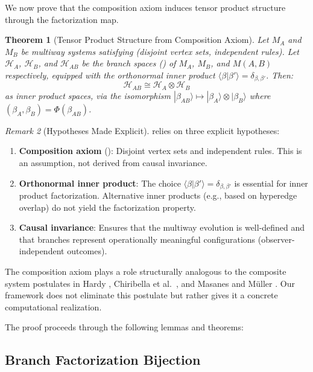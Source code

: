\documentclass[11pt,a4paper]{article}
\newtheorem{theorem}{Theorem}[section]
\theoremstyle{definition}
\theoremstyle{remark}
\newtheorem{remark}[theorem]{Remark}
\newcommand{\Hilb}{\mathcal{H}}
\newcommand{\ket}[1]{|#1\rangle}
\newcommand{\braket}[2]{\langle#1|#2\rangle}
\begin{document}
We now prove that the composition axiom induces tensor product structure through the factorization map.

\begin{theorem}[Tensor Product Structure from Composition Axiom]
\label{thm:tensor_product_main}
Let $M_A$ and $M_B$ be multiway systems satisfying 
(disjoint vertex sets, independent rules). Let $\Hilb_A$, $\Hilb_B$,
and $\Hilb_{AB}$ be the branch spaces () of
$M_A$, $M_B$, and $M(A,B)$ respectively, equipped with the
orthonormal inner product $\braket{\beta}{\beta'} = \delta_{\beta,\beta'}$.
Then:
\begin{equation}
\Hilb_{AB} \cong \Hilb_A \otimes \Hilb_B
\end{equation}
as inner product spaces, via the isomorphism
$\ket{\beta_{AB}} \mapsto \ket{\beta_A} \otimes \ket{\beta_B}$ where
$(\beta_A, \beta_B) = \Phi(\beta_{AB})$.
\end{theorem}

\begin{remark}[Hypotheses Made Explicit]
 relies on three explicit hypotheses:
\begin{enumerate}
\item \textbf{Composition axiom} (): Disjoint
  vertex sets and independent rules. This is an assumption, not derived
  from causal invariance.
\item \textbf{Orthonormal inner product}: The choice
  $\braket{\beta}{\beta'} = \delta_{\beta,\beta'}$ is essential for
  inner product factorization. Alternative inner products (e.g., based
  on hyperedge overlap) do not yield the factorization property.
\item \textbf{Causal invariance}: Ensures that the multiway evolution is
  well-defined and that branches represent operationally meaningful
  configurations (observer-independent outcomes).
\end{enumerate}
The composition axiom plays a role structurally analogous to the
composite system postulates in Hardy \cite{hardy2001quantum}, Chiribella
et al.\ \cite{chiribella2011informational}, and Masanes and M\"uller
\cite{masanes2011general}. Our framework does not eliminate this
postulate but rather gives it a concrete computational realization.
\end{remark}

The proof proceeds through the following lemmas and theorems:

\subsection{Branch Factorization Bijection}
\end{document}
